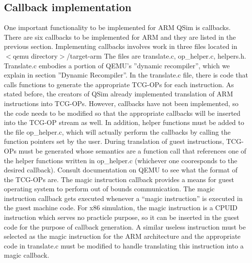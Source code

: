 \documentclass[letterpaper,10pt,twocolumn]{article}
\begin{document}
\subsection{Callback implementation}
One important functionality to be implemented for ARM QSim is callbacks. There are six callbacks to be implemented for ARM and they are listed in the previous section. Implementing callbacks involves work in three files located in
$<$qemu directory$>$/target-arm The files are translate.c, op\_helper.c, helpers.h. Translate.c embodies a portion of QEMU’s ''dynamic recompiler'', which we explain in section ''Dynamic Recompiler''. In the translate.c file, there is code that calls functions to generate the appropriate TCG-OPs for each instruction. As stated before, the creators of QSim already implemented translation of ARM instructions into TCG-OPs. However, callbacks have not been implemented, so the code needs to be modified so that the appropriate callbacks will be inserted into the TCG-OP stream as well. In addition, helper functions must be added to the file op\_helper.c, which will actually perform the callbacks by calling the  function pointers set by the user. During translation of guest instructions, TCG-OPs must be generated whose semantics are a function call that references one of the helper functions written in op\_helper.c (whichever one cooresponds to the desired callback). Consult documentation on QEMU to see what the format of the TCG-OPs are.
The magic instruction callback provides a means for guest operating system to perform out of bounds communication. The magic instruction callback gets executed whenever a “magic instruction” is executed in the guest machine code. For x86 simulation, the magic instruction is a CPUID instruction which serves no practicle purpose, so it can be inserted in the guest code for the purpose of callback generation. A similar useless instruction must be selected as the magic instruction for the ARM architecture and the appropriate code in translate.c must be modified to handle translating this instruction into a magic callback.
\end{document}
